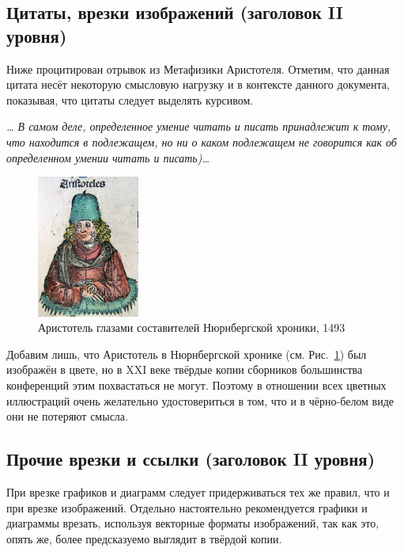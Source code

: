 \documentclass{math-mech-sci}
\begin{document}
\subsection{Цитаты, врезки изображений (заголовок II уровня)}

Ниже процитирован отрывок из Метафизики Аристотеля. Отметим, что
данная цитата несёт некоторую смысловую нагрузку и в контексте данного
документа, показывая, что цитаты следует выделять курсивом.

\emph{\ldots{} В самом деле, определенное умение читать и писать
  принадлежит к тому, что находится в подлежащем, но ни о каком
  подлежащем не говорится как об определенном умении читать и
  писать)\ldots}

\begin{figure}[h]
\begin{center}
\includegraphics[width=0.3\textwidth]{Aristotle.jpg}
\end{center}
\caption{Аристотель глазами составителей Нюрнбергской хроники,
  1493}\label{fig:aristotle}
\end{figure}

Добавим лишь, что Аристотель в Нюрнбергской хронике
(см. Рис.~\ref{fig:aristotle}) был изображён в цвете, но в XXI веке
твёрдые копии сборников большинства конференций этим похвастаться не
могут. Поэтому в отношении всех цветных иллюстраций очень желательно
удостовериться в том, что и в чёрно-белом виде они не потеряют смысла.

\subsection{Прочие врезки и ссылки (заголовок II уровня)}

При врезке графиков и диаграмм следует придерживаться тех же правил,
что и при врезке изображений. Отдельно настоятельно рекомендуется
графики и диаграммы врезать, используя векторные форматы изображений,
так как это, опять же, более предсказуемо выглядит в твёрдой копии.
\end{document}
